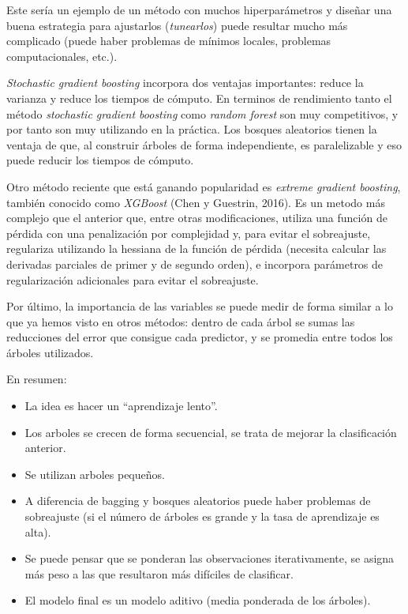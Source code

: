 \documentclass[]{book}
\theoremstyle{break}
\theoremstyle{definition}
\theoremstyle{definition}
\theoremstyle{definition}
\theoremstyle{remark}
\begin{document}
Este sería un ejemplo de un método con muchos hiperparámetros y diseñar
una buena estrategia para ajustarlos (\emph{tunearlos}) puede resultar
mucho más complicado (puede haber problemas de mínimos locales,
problemas computacionales, etc.).

\emph{Stochastic gradient boosting} incorpora dos ventajas importantes:
reduce la varianza y reduce los tiempos de cómputo. En terminos de
rendimiento tanto el método \emph{stochastic gradient boosting} como
\emph{random forest} son muy competitivos, y por tanto son muy
utilizando en la práctica. Los bosques aleatorios tienen la ventaja de
que, al construir árboles de forma independiente, es paralelizable y eso
puede reducir los tiempos de cómputo.

Otro método reciente que está ganando popularidad es \emph{extreme
gradient boosting}, también conocido como \emph{XGBoost} (Chen y
Guestrin, 2016). Es un metodo más complejo que el anterior que, entre
otras modificaciones, utiliza una función de pérdida con una
penalización por complejidad y, para evitar el sobreajuste, regulariza
utilizando la hessiana de la función de pérdida (necesita calcular las
derivadas parciales de primer y de segundo orden), e incorpora
parámetros de regularización adicionales para evitar el sobreajuste.

Por último, la importancia de las variables se puede medir de forma
similar a lo que ya hemos visto en otros métodos: dentro de cada árbol
se sumas las reducciones del error que consigue cada predictor, y se
promedia entre todos los árboles utilizados.

En resumen:

\begin{itemize}
\item
  La idea es hacer un ``aprendizaje lento''.
\item
  Los arboles se crecen de forma secuencial, se trata de mejorar la
  clasificación anterior.
\item
  Se utilizan arboles pequeños.
\item
  A diferencia de bagging y bosques aleatorios puede haber problemas de
  sobreajuste (si el número de árboles es grande y la tasa de
  aprendizaje es alta).
\item
  Se puede pensar que se ponderan las observaciones iterativamente, se
  asigna más peso a las que resultaron más difíciles de clasificar.
\item
  El modelo final es un modelo aditivo (media ponderada de los árboles).
\end{itemize}
\end{document}
